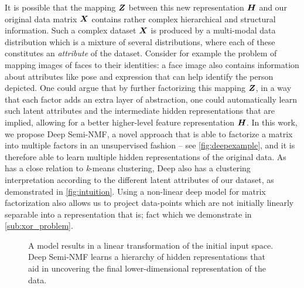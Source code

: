 \documentclass[10pt,journal,compsoc]{IEEEtran}
\begin{document}
It is possible that the mapping $\boldsymbol Z$ between this new representation $\boldsymbol H$ and our original data matrix $\boldsymbol X$ contains rather complex hierarchical and structural information. Such a complex dataset $\boldsymbol X$ is produced by a multi-modal data distribution which is a mixture of several distributions, where each of these constitutes an {\it attribute} of the dataset. Consider for example the problem of mapping images of faces to their identities: a face image also contains information about attributes like pose and expression that can help identify the person depicted. One could argue that by further factorizing this mapping $\boldsymbol Z$, in a way that each factor adds an extra layer of abstraction, one could automatically learn such latent attributes and the intermediate hidden representations that are implied, allowing for a better higher-level feature representation $\boldsymbol H$. In this work, we propose Deep Semi-NMF, a novel approach that is able to factorize a matrix into multiple factors in an unsupervised fashion -- see \autoref{fig:deepexample}, and it is therefore able to learn multiple hidden representations of the original data. 
As \seminmf has a close relation to \emph{k}-means clustering, Deep \seminmf also has a clustering interpretation according to the different latent attributes of our dataset, as demonstrated in \autoref{fig:intuition}. 
Using a non-linear deep model for matrix factorization also allows us to project data-points which are not initially linearly separable into a representation that is; fact which we demonstrate in \autoref{sub:xor_problem}.

\begin{figure}[tb]
\hspace{1cm}
\caption{\protect{} A \seminmf model results in a linear transformation of the initial input space. \protect{} Deep Semi-NMF learns a hierarchy of hidden representations that aid in uncovering the final lower-dimensional representation of the data.}
\label{fig:deepexample}
\end{figure}
\end{document}
